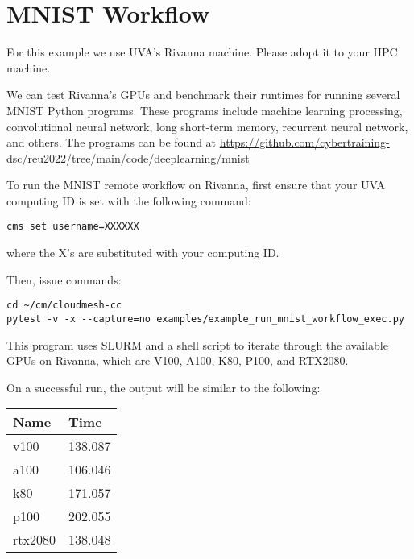 \section{MNIST Workflow}\label{mnist-workflow}

For this example we use UVA's Rivanna machine. Please adopt it to your
HPC machine.

We can test Rivanna's GPUs and benchmark their runtimes for running
several MNIST Python programs. These programs include machine learning
processing, convolutional neural network, long short-term memory,
recurrent neural network, and others. The programs can be found at
\url{https://github.com/cybertraining-dsc/reu2022/tree/main/code/deeplearning/mnist}

To run the MNIST remote workflow on Rivanna, first ensure that your UVA
computing ID is set with the following command:

\begin{verbatim}
cms set username=XXXXXX
\end{verbatim}

where the X's are substituted with your computing ID.

Then, issue commands:

\begin{verbatim}
cd ~/cm/cloudmesh-cc
pytest -v -x --capture=no examples/example_run_mnist_workflow_exec.py
\end{verbatim}

This program uses SLURM and a shell script to iterate through the
available GPUs on Rivanna, which are V100, A100, K80, P100, and RTX2080.

On a successful run, the output will be similar to the following:

\begin{table}[!ht]
    \centering
    \begin{tabular}{|l|l|}
    \hline
        Name & Time \\ \hline
        v100 & 138.087 \\ \hline
        a100 & 106.046 \\ \hline
        k80 & 171.057 \\ \hline
        p100 & 202.055 \\ \hline
        rtx2080 & 138.048 \\ \hline
    \end{tabular}
  \end{table}
  

